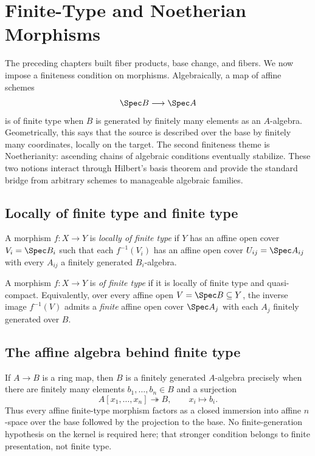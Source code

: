 \chapter{Finite-Type and Noetherian Morphisms}\label{ch:vi26-finite-type-noetherian}

The preceding chapters built fiber products, base change, and fibers.  We now impose a finiteness condition on
morphisms.  Algebraically, a map of affine schemes
\[
\Spec B\longrightarrow\Spec A
\]
is of finite type when $B$ is generated by finitely many elements as an $A$-algebra.  Geometrically, this says
that the source is described over the base by finitely many coordinates, locally on the target.  The second
finiteness theme is Noetherianity: ascending chains of algebraic conditions eventually stabilize.  These two
notions interact through Hilbert's basis theorem and provide the standard bridge from arbitrary schemes to
manageable algebraic families.

\section{Locally of finite type and finite type}
\begin{definition}\label{def:vi26-lft}
A morphism $f:X\to Y$ is \emph{locally of finite type} if $Y$ has an affine open cover $V_i=\Spec B_i$ such that
each $f^{-1}(V_i)$ has an affine open cover $U_{ij}=\Spec A_{ij}$ with every $A_{ij}$ a finitely generated
$B_i$-algebra.
\end{definition}

\begin{definition}\label{def:vi26-ft}
A morphism $f:X\to Y$ is \emph{of finite type} if it is locally of finite type and quasi-compact.  Equivalently,
over every affine open $V=\Spec B\subseteq Y$, the inverse image $f^{-1}(V)$ admits a \emph{finite} affine open
cover $\Spec A_j$ with each $A_j$ finitely generated over $B$.
\end{definition}



\section{The affine algebra behind finite type}
If $A\to B$ is a ring map, then $B$ is a finitely generated $A$-algebra precisely when there are finitely many
elements $b_1,\dots,b_n\in B$ and a surjection
\[
A[x_1,\dots,x_n]\twoheadrightarrow B,\qquad x_i\mapsto b_i.
\]
Thus every affine finite-type morphism factors as a closed immersion into affine $n$-space over the base followed
by the projection to the base.  No finite-generation hypothesis on the kernel is required here; that stronger
condition belongs to finite presentation, not finite type.

